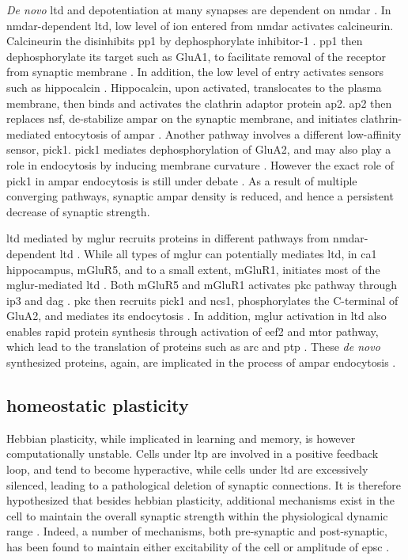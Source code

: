 \textit{De novo} \gls{ltd} and depotentiation at many synapses are dependent on \gls{nmdar} \citep{collingridge83, dudek92}. In \gls{nmdar}-dependent \gls{ltd}, low level of  ion entered from \gls{nmdar} activates calcineurin. Calcineurin the disinhibits \gls{pp1} by dephosphorylate inhibitor-1 \citep{mulkey93}. \Gls{pp1} then dephosphorylate its target such as GluA1, to facilitate removal of the receptor from synaptic membrane \citep{collingridge04}. In addition, the low level of  entry activates  sensors such as hippocalcin \citep{palmer05}. Hippocalcin, upon activated, translocates to the plasma membrane, then binds and activates the clathrin adaptor protein \gls{ap2}. \Gls{ap2} then replaces \gls{nsf}, de-stabilize \gls{ampar} on the synaptic membrane, and initiates clathrin-mediated entocytosis of \gls{ampar} \citep{collingridge04, palmer05}. Another pathway involves a different low-affinity  sensor, \gls{pick1}. \Gls{pick1} mediates dephosphorylation of GluA2, and may also play a role in endocytosis by inducing membrane curvature \citep{collingridge04, lin07}. However the exact role of \gls{pick1} in \gls{ampar} endocytosis is still under debate \citep{collingridge10}. As a result of multiple converging pathways, synaptic \gls{ampar} density is reduced, and hence a persistent decrease of synaptic strength.

\Gls{ltd} mediated by \gls{mglur} recruits proteins in different pathways from \gls{nmdar}-dependent \gls{ltd} \citep{gladding09}. While all types of \gls{mglur} can potentially mediates \gls{ltd}, in \gls{ca1} hippocampus, mGluR5, and to a small extent, mGluR1, initiates most of the \gls{mglur}-mediated \gls{ltd} \citep{luscher10}. Both mGluR5 and mGluR1 activates \gls{pkc} pathway through \gls{ip3} and \gls{dag} \citep{oliet97}. \Gls{pkc} then recruits \gls{pick1} and \gls{ncs1}, phosphorylates the C-terminal of GluA2, and mediates its endocytosis \citep{bellone06, jo08}. In addition, \gls{mglur} activation in \gls{ltd} also enables rapid protein synthesis through activation of \gls{eef2} and \gls{mtor} pathway, which lead to the translation of proteins such as \gls{arc} and \gls{ptp} \citep{park08, zhang08}. These \textit{de novo} synthesized proteins, again, are implicated in the process of \gls{ampar} endocytosis \citep{collingridge10}.

\subsection{homeostatic plasticity}
Hebbian plasticity, while implicated in learning and memory, is however computationally unstable. Cells under \gls{ltp} are involved in a positive feedback loop, and tend to become hyperactive, while cells under \gls{ltd} are excessively silenced, leading to a pathological deletion of synaptic connections. It is therefore hypothesized that besides hebbian plasticity, additional mechanisms exist in the cell to maintain the overall synaptic strength within the physiological dynamic range \citep{bienenstock82, cooper12}. Indeed, a number of mechanisms, both pre-synaptic and post-synaptic, has been found to maintain either excitability of the cell or amplitude of \gls{epsc} \citep{turrigiano98, frank06, collingridge10, chater14, wang16}. 

